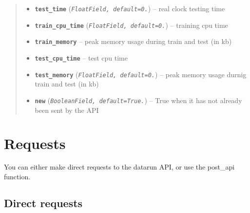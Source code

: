 \documentclass[letterpaper,10pt,english]{sphinxmanual}
\begin{document}
\begin{fulllineitems}
\begin{quote}
\begin{description}
\begin{itemize}
\item {} 
\textbf{\texttt{test\_time}} (\emph{\texttt{FloatField, default=0.}}) -- real clock testing time

\item {} 
\textbf{\texttt{train\_cpu\_time}} (\emph{\texttt{FloatField, default=0.}}) -- training cpu time

\item {} 
\textbf{\texttt{train\_memory}} -- peak memory usage during train and test (in kb)

\item {} 
\textbf{\texttt{test\_cpu\_time}} -- test cpu time

\item {} 
\textbf{\texttt{test\_memory}} (\emph{\texttt{FloatField, default=0.}}) -- peak memory usage durnig train and test (in kb)

\item {} 
\textbf{\texttt{new}} (\emph{\texttt{BooleanField, default=True.}}) -- True when it has not already been sent by the API

\end{itemize}

\end{description}\end{quote}

\end{fulllineitems}



\chapter{Requests}
\label{modules/views:requests}\label{modules/views::doc}
You can either make direct requests to the datarun API, or use the post\_api function.


\section{Direct requests}
\label{modules/views:direct-requests}\label{modules/views:module-runapp.views}
\end{document}
